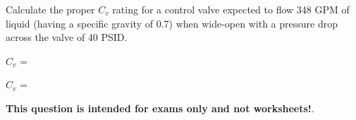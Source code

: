 

Calculate the proper $C_v$ rating for a control valve expected to flow 348 GPM of liquid (having a specific gravity of 0.7) when wide-open with a pressure drop across the valve of 40 PSID.

\vskip 10pt

$C_v$ = \underbar{\hskip 50pt}







$C_v$ = 







{\bf This question is intended for exams only and not worksheets!}.



